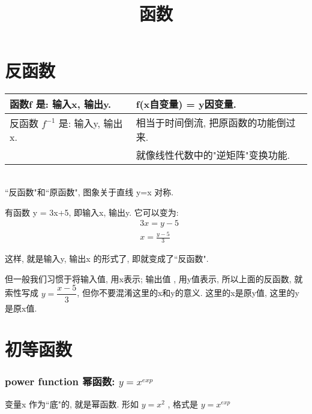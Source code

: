 \documentclass[UTF8]{ctexart}
\title{函数}
\begin{document}
	\tableofcontents %
	\date{} %
	\maketitle  %

\part{反函数}



\begin{tabular}{|l| l| }
	\hline
	函数f 是: 输入x, 输出y.
	 &  f(x自变量) = y因变量. \\	 
	\hline	
	
	反函数 $f^{-1}$ 是: 输入y, 输出x. 
	&  相当于时间倒流, 把原函数的功能倒过来.  \\
	& 就像线性代数中的"逆矩阵"变换功能. \\
	\hline
\end{tabular}
\\

``反函数"和``原函数", 图象关于直线 y=x 对称. \\


\begin{myEnvSample}
有函数 y = 3x+5, 即输入x, 输出y. 它可以变为: 
	\begin{align*}
		& 3x = y-5 \\
		& x = \frac{y-5} {3} 
	\end{align*}
	
	这样, 就是输入y, 输出x 的形式了, 即就变成了``反函数".
	
	但一般我们习惯于将输入值, 用x表示; 输出值 , 用y值表示, 所以上面的反函数, 就索性写成  $ y = \dfrac{x-5} {3} $, 但你不要混淆这里的x和y的意义. 这里的x是原y值, 这里的y是原x值.
\end{myEnvSample}






\part{初等函数}

\section{power function 幂函数:  $ y = x^{exp} $}

变量x 作为``底"的, 就是幂函数. 形如 $ y=x^2 $ , 格式是 $ y = x^{exp} $
\end{document}
